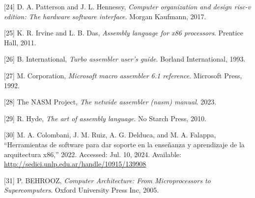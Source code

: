 \documentclass[12pt,twoside]{templates/unerthesis}
\begin{document}
\leavevmode\hypertarget{ref-patterson_computer_2017}{}%
{[}24{]} D. A. Patterson and J. L. Hennessy, \emph{Computer organization and design risc-v edition: The hardware software interface}. Morgan Kaufmann, 2017.

\leavevmode\hypertarget{ref-irvine2011assembly}{}%
{[}25{]} K. R. Irvine and L. B. Das, \emph{Assembly language for x86 processors}. Prentice Hall, 2011.

\leavevmode\hypertarget{ref-tasm}{}%
{[}26{]} B. International, \emph{Turbo assembler user's guide}. Borland International, 1993.

\leavevmode\hypertarget{ref-masm}{}%
{[}27{]} M. Corporation, \emph{Microsoft macro assembler 6.1 reference}. Microsoft Press, 1992.

\leavevmode\hypertarget{ref-nasm}{}%
{[}28{]} The NASM Project, \emph{The netwide assembler (nasm) manual}. 2023.

\leavevmode\hypertarget{ref-hyde2010art}{}%
{[}29{]} R. Hyde, \emph{The art of assembly language}. No Starch Press, 2010.

\leavevmode\hypertarget{ref-colombani_herramientas_2022}{}%
{[}30{]} M. A. Colombani, J. M. Ruiz, A. G. Delduca, and M. A. Falappa, ``Herramientas de software para dar soporte en la enseñanza y aprendizaje de la arquitectura x86,'' 2022. Accessed: Jul. 10, 2024. Available: \url{http://sedici.unlp.edu.ar/handle/10915/139908}

\leavevmode\hypertarget{ref-behrooz_computer_2005}{}%
{[}31{]} P. BEHROOZ, \emph{Computer Architecture: From Microprocessors to Supercomputers}. Oxford University Press Inc, 2005.




\end{document}

